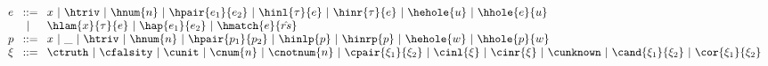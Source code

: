 
\begin{figure}[h]
$\arraycolsep=4pt\begin{array}{lll}
e & ::= &
  x ~\vert~
  \htriv ~\vert~
  \hnum{n} ~\vert~
  \hpair{e_1}{e_2} ~\vert~
  \hinl{\tau}{e} ~\vert~
  \hinr{\tau}{e} ~\vert~
  \hehole{u} ~\vert~
  \hhole{e}{u} \\
  & ~\vert~ &
  \hlam{x}{\tau}{e} ~\vert~
  \hap{e_1}{e_2} ~\vert~
  \hmatch{e}{\hat{rs}} \\
p & ::= &
  x ~\vert~
  \_ ~\vert~
  \htriv ~\vert~
  \hnum{n} ~\vert~
  \hpair{p_1}{p_2} ~\vert~
  \hinlp{p} ~\vert~
  \hinrp{p} ~\vert~
  \hehole{w} ~\vert~
  \hhole{p}{w} \\
\xi & ::= &
  \ctruth ~\vert~
  \cfalsity ~\vert~
  \cunit ~\vert~
  \cnum{n} ~\vert~
  \cnotnum{n} ~\vert~
  \cpair{\xi_1}{\xi_2} ~\vert~
  \cinl{\xi} ~\vert~
  \cinr{\xi} ~\vert~
  \cunknown ~\vert~
  \cand{\xi_1}{\xi_2} ~\vert~
  \cor{\xi_1}{\xi_2}
\end{array}$
\label{fig:exp-pat-constraint}
\end{figure}
